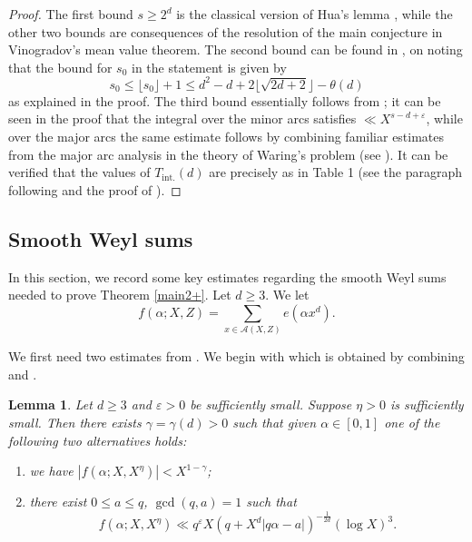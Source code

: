 \documentclass[reqno, 12pt, reqno]{amsart}
\numberwithin{equation}{section}
\newtheorem{lemma}[theorem]{Lemma}
\renewcommand{\leq}{\leqslant}
\renewcommand{\geq}{\geqslant}
\renewcommand{\=}{\equiv}
\begin{document}
\begin{proof}
The first bound $s \geq 2^d$ is the classical version of Hua's lemma \cite[Lemma 2.5]{Vaughan}, while
the other two bounds are consequences of the resolution of the main conjecture in Vinogradov's mean value theorem.
The second bound can be found in \cite[Cor. 14.7]{Wooley}, on noting that the bound for $s_0$ in the statement is given by
$$
s_0 \leq \lfloor s_0 \rfloor +  1 \leq d^2 - d + 2 \lfloor \sqrt{2d+2} \rfloor - \theta(d)
$$
as explained in the proof. The third bound essentially follows from \cite[Thm. 4.1]{imrn}; it can be seen in the proof that the
integral over the minor arcs satisfies $\ll X^{s - d + \varepsilon}$, while over the major arcs the same estimate follows
by combining familiar estimates from the major arc analysis in the theory of Waring's problem (see \cite[Section 4]{Vaughan}).
It can be verified that the values of $T_{\text{int.}}(d)$ are precisely as in Table 1 (see the paragraph following \cite[Cor. 14.7]{Wooley}
and the proof of \cite[Thm. 4.1]{imrn}).
\end{proof}


\subsection{Smooth Weyl sums}
\label{smoothW}
In this section, we record some key estimates regarding the smooth Weyl sums needed to prove Theorem \ref{main2+}.
Let $d \geq 3$. We let
$$
f(\alpha; X, Z) = \sum_{ x \in \mathcal{A}(X, Z) } e(\alpha x^d).
$$

We first need two estimates from \cite{BC}.
We begin with \cite[Lemma 3]{BC} which is obtained by combining \cite[Theorem 1.8]{Va89} and \cite[Lemma 7.2]{VW}.
\begin{lemma}\cite[Lemma 3]{BC}
\label{BClem}
Let $d \geq 3$ and  $\varepsilon > 0$ be sufficiently small.
Suppose $\eta > 0$ is sufficiently small.
Then there exists $\gamma = \gamma(d) > 0$ such that
given $\alpha \in [0,1]$ one of the following two alternatives holds:
\begin{enumerate}
\item[(i)] we have $| f(\alpha; X, X^{\eta}) | < X^{1 - \gamma}$;
\item[(ii)] there exist $0 \leq a \leq q$, $\gcd(q, a) = 1$ such that
$$
f(\alpha; X, X^{\eta})  \ll q^{\varepsilon} X  ( q + X^d | q \alpha - a| )^{ -  \frac{1}{2d}} (\log X)^3.
$$
\end{enumerate}
\end{lemma}
\end{document}
